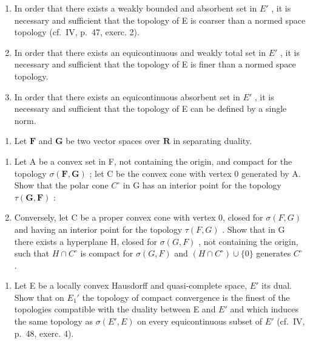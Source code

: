 \begin{enumerate}
\def\labelenumi{\alph{enumi})}
\item
  In order that there exists a weakly bounded and absorbent set in \(E'\) , it is necessary and sufficient that the topology of E is coarser than a normed space topology (cf.~IV, p.~47, exerc. 2).
\item
  In order that there exists an equicontinuous and weakly total set in \(E'\) , it is necessary and sufficient that the topology of E is finer than a normed space topology.
\item
  In order that there exists an equicontinuous absorbent set in \(E'\) , it is necessary and sufficient that the topology of E can be defined by a single norm.
\end{enumerate}

\begin{enumerate}
\def\labelenumi{\arabic{enumi})}
\setcounter{enumi}{12}
\tightlist
\item
  Let \(\mathbf{F}\) and \(\mathbf{G}\) be two vector spaces over \(\mathbf{R}\) in separating duality.
\end{enumerate}

\begin{enumerate}
\def\labelenumi{\alph{enumi})}
\item
  Let A be a convex set in F, not containing the origin, and compact for the topology \(\sigma(\mathbf{F}, \mathbf{G})\) ; let C be the convex cone with vertex 0 generated by A. Show that the polar cone \(C^{\circ}\) in G has an interior point for the topology \(\tau(\mathbf{G}, \mathbf{F})\) :
\item
  Conversely, let C be a proper convex cone with vertex 0, closed for \(\sigma(F, G)\) and having an interior point for the topology \(\tau(F, G)\) . Show that in G there exists a hyperplane H, closed for \(\sigma(G, F)\) , not containing the origin, such that \(H \cap C^{\circ}\) is compact for \(\sigma(G, F)\) and \((H \cap C^{\circ}) \cup \{0\}\) generates \(C^{\circ}\) .
\end{enumerate}

\begin{enumerate}
\def\labelenumi{\arabic{enumi})}
\setcounter{enumi}{13}
\tightlist
\item
  Let E be a locally convex Hausdorff and quasi-complete space, \(E'\) its dual. Show that on \(E_{1}'\) the topology of compact convergence is the finest of the topologies compatible with the duality between E and \(E'\) and which induces the same topology as \(\sigma(E', E)\) on every equicontinuous subset of \(E'\) (cf.~IV, p.~48, exerc. 4).
\end{enumerate}

